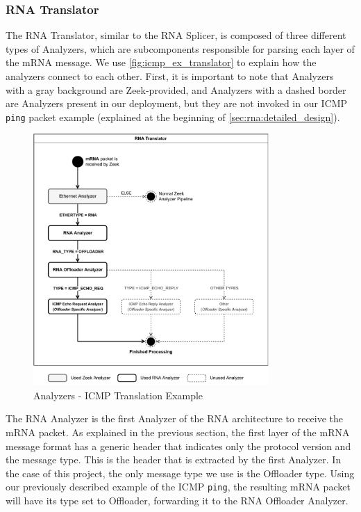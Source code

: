 \subsubsection*{RNA Translator}

The RNA Translator, similar to the RNA Splicer, is composed of three different types of Analyzers, which are subcomponents responsible for parsing each layer of the mRNA message. We use \autoref{fig:icmp_ex_translator} to explain how the analyzers connect to each other. First, it is important to note that Analyzers with a gray background are Zeek-provided, and Analyzers with a dashed border are Analyzers present in our deployment, but they are not invoked in our ICMP \texttt{ping} packet example (explained at the beginning of \autoref{sec:rna:detailed_design}).

\begin{figure}[ht]
    \caption{Analyzers - ICMP Translation Example}
    \begin{center}
        \includegraphics[width=0.8\textwidth]{images/icmp_ex_translator.pdf}  
    \end{center}
    \label{fig:icmp_ex_translator}
\end{figure}

The RNA Analyzer is the first Analyzer of the RNA architecture to receive the mRNA packet. As explained in the previous section, the first layer of the mRNA message format has a generic header that indicates only the protocol version and the message type. This is the header that is extracted by the first Analyzer. In the case of this project, the only message type we use is the Offloader type\footnotemark{}. Using our previously described example of the ICMP \texttt{ping}, the resulting mRNA packet will have its type set to Offloader, forwarding it to the RNA Offloader Analyzer.

